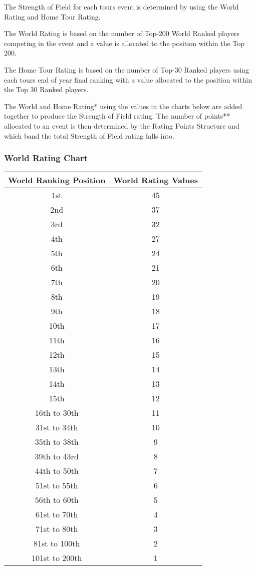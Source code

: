 \documentclass{article}
\begin{document}
The Strength of Field for each tours event is determined by using the World Rating and Home Tour Rating.

The World Rating is based on the number of Top-200 World Ranked players competing in the event and a value is allocated to the position within the Top 200.

The Home Tour Rating is based on the number of Top-30 Ranked players using each tours end of year final ranking with a value allocated to the position within the Top 30 Ranked players.

The World and Home Rating* using the values in the charts below are added together to produce the Strength of Field rating. The number of points** allocated to an event is then determined by the Rating Points Structure and which band the total Strength of Field rating falls into.

\subsubsection{World Rating Chart}
\begin{center}
\begin{tabular}{ | c | c | }
\hline
World Ranking Position &	World Rating Values\\
\hline
1st &	45\\
2nd &	37\\
3rd	&32\\
4th	&27\\
5th	&24\\
6th	&21\\
7th	&20\\
8th	&19\\
9th	&18\\
10th&	17\\
11th&	16\\
12th&	15\\
13th&	14\\
14th&	13\\
15th&	12\\
16th to 30th&	11\\
31st to 34th&	10\\
35th to 38th	&9\\
39th to 43rd	&8\\
44th to 50th	&7\\
51st to 55th	&6\\
56th to 60th	&5\\
61st to 70th	&4\\
71st to 80th	&3\\
81st to 100th	&2\\
101st to 200th& 	1\\
\hline
\end{tabular}
\end{center}
\end{document}
